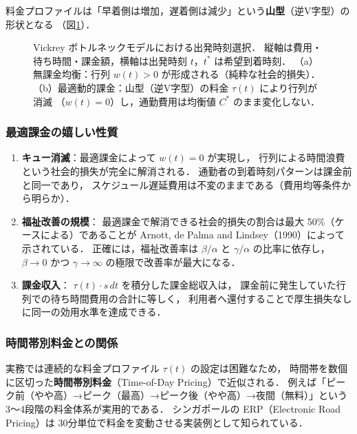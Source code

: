 料金プロファイルは「早着側は増加，遅着側は減少」という\textbf{山型}（逆V字型）の形状となる
（図\ref{fig:vickrey-bottleneck}）．

\begin{figure}[hbtp]
  \centering
  
  \caption{Vickrey ボトルネックモデルにおける出発時刻選択．
           縦軸は費用・待ち時間・課金額，横軸は出発時刻 $t$，$t^*$ は希望到着時刻．
           （a）無課金均衡：行列 $w(t) > 0$ が形成される（純粋な社会的損失）．
           （b）最適動的課金：山型（逆V字型）の料金 $\tau(t)$ により行列が消滅
           （$w(t) = 0$）し，通勤費用は均衡値 $C^*$ のまま変化しない．}
  \label{fig:vickrey-bottleneck}
\end{figure}

\subsubsection*{最適課金の嬉しい性質}

\begin{enumerate}
  \item
    \textbf{キュー消滅}：最適課金によって $w(t)=0$ が実現し，
    行列による時間浪費という社会的損失が完全に解消される．
    通勤者の到着時刻パターンは課金前と同一であり，
    スケジュール遅延費用は不変のままである（費用均等条件から明らか）．

  \item
    \textbf{福祉改善の規模}：
    最適課金で解消できる社会的損失の割合は最大 50\%（ケースによる）であることが
    Arnott, de Palma and Lindsey（1990）によって示されている\cite{ArnottdePalmaLindsey1990}．
    正確には，福祉改善率は $\beta/\alpha$ と $\gamma/\alpha$ の比率に依存し，
    $\beta \to 0$ かつ $\gamma \to \infty$ の極限で改善率が最大になる．

  \item
    \textbf{課金収入}：
    $\tau(t) \cdot s\,dt$ を積分した課金総収入は，
    課金前に発生していた行列での待ち時間費用の合計に等しく，
    利用者へ還付することで厚生損失なしに同一の効用水準を達成できる．
\end{enumerate}

\subsubsection*{時間帯別料金との関係}

実務では連続的な料金プロファイル $\tau(t)$ の設定は困難なため，
時間帯を数個に区切った\textbf{時間帯別料金}（Time-of-Day Pricing）で近似される．
例えば「ピーク前（やや高）→ピーク（最高）→ピーク後（やや高）→夜間（無料）」という
3〜4段階の料金体系が実用的である．
シンガポールの ERP（Electronic Road Pricing）は
30分単位で料金を変動させる実装例として知られている．

